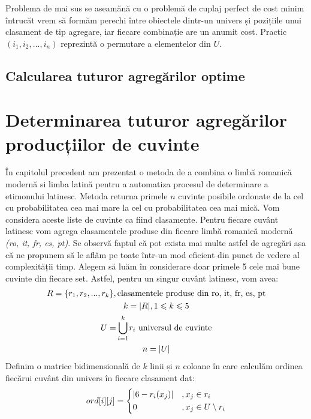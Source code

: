 Problema de mai sus se aseamănă cu o problemă de cuplaj perfect de cost minim întrucăt vrem să formăm
perechi între obiectele dintr-un univers și pozițiile unui clasament de tip agregare, iar fiecare
combinație are un anumit cost. Practic $(i_1, i_2, ..., i_n)$ reprezintă o permutare a elementelor
din $U$.

\subsection{Calcularea tuturor agregărilor optime}



\section{Determinarea tuturor agregărilor producțiilor de cuvinte}
În capitolul precedent am prezentat o metoda de a combina o limbă romanică modernă si limba latină
pentru a automatiza procesul de determinare a etimonului latinesc. Metoda returna primele $n$
cuvinte posibile ordonate de la cel cu probabilitatea cea mai mare la cel cu probabilitatea cea mai
mică. Vom considera aceste liste de cuvinte ca fiind clasamente. Pentru fiecare cuvânt latinesc vom
agrega clasamentele produse din fiecare limbă romanică modernă \textit{(ro, it, fr, es, pt)}.
Se observă faptul că pot exista mai multe astfel de agregări așa că ne propunem să le aflăm pe toate
într-un mod eficient din punct de vedere al complexității timp. Alegem să luăm în considerare
doar primele 5 cele mai bune cuvinte din fiecare set. Astfel, pentru un singur cuvânt latinesc, vom 
avea:
\begin{gather*}
  R = \{r_1, r_2, ..., r_k\}, \text{clasamentele produse din ro, it, fr, es, pt} \\
  k = |R|, 1 \leqslant k \leqslant 5 \\
  U = \smashoperator{\bigcup_{i = 1}^{k}} r_i \text{ universul de cuvinte} \\
  n = |U|
\end{gather*}
Definim o matrice bidimensională de $k$ linii și $n$ coloane în care calculăm ordinea fiecărui 
cuvânt din univers în fiecare clasament dat:
\[
  ord[i][j] = \begin{dcases}
    |6 - r_i(x_j)|    &, x_j \in r_i \\
    0                 &, x_j \in U \setminus r_i 
  \end{dcases}
\]
